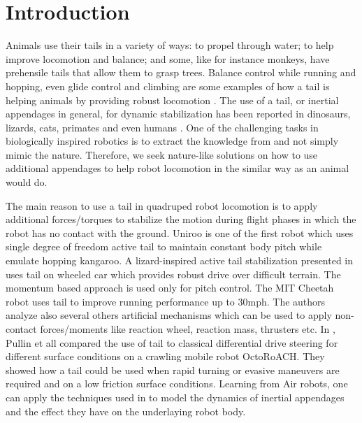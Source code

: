 \section{Introduction}\label{sec:introduction}

Animals use their tails in a variety of ways: to propel through water; to help improve locomotion and balance; and some, like for instance monkeys, have prehensile tails that allow them to grasp trees. Balance control while running and hopping, even glide control and climbing are some examples of how a tail is helping animals by providing robust locomotion \cite{Thomas:Nature2012}. The use of a tail, or inertial appendages in general, for dynamic stabilization has been reported in dinosaurs, lizards, cats, primates and even humans \cite{ostrom1969osteology,PijnappelsSringer,Walker199841,JusufiIOP2010}. One of the challenging tasks in biologically inspired robotics is to extract the knowledge from and not simply mimic the nature. Therefore, we seek nature-like solutions on how to use additional appendages to help robot locomotion in the similar way as an animal would do.  

The main reason to use a tail in quadruped robot locomotion is to apply additional forces/torques to stabilize the motion during flight phases in which the robot has no contact with the ground. Uniroo \cite{zeglin1991uniroo} is one of the first robot which uses single degree of freedom active tail to maintain constant body pitch while emulate hopping kangaroo. A lizard-inspired active tail stabilization presented in \cite{conf/iros/Chang-SiuLTF11} uses tail on wheeled car which provides robust drive over difficult terrain. The momentum based approach is used only for pitch control. The MIT Cheetah robot \cite{DBLP:conf/iros/BriggsLHK12} uses tail to improve running performance up to 30mph. The authors analyze also several others artificial mechanisms which can be used to apply non-contact forces/moments like reaction wheel, reaction mass, thrusters etc. In \cite{PullinICRA12}, Pullin et all compared the use of tail to classical differential drive steering for different surface conditions on a crawling mobile robot OctoRoACH. They showed how a tail could be used when rapid turning or evasive maneuvers are required and on a low friction surface conditions. Learning from Air robots, one can apply the techniques used in \cite{Korpela2013ICRA,Orsag2012JINT} to model the dynamics of inertial appendages and the effect they have on the underlaying robot body.

